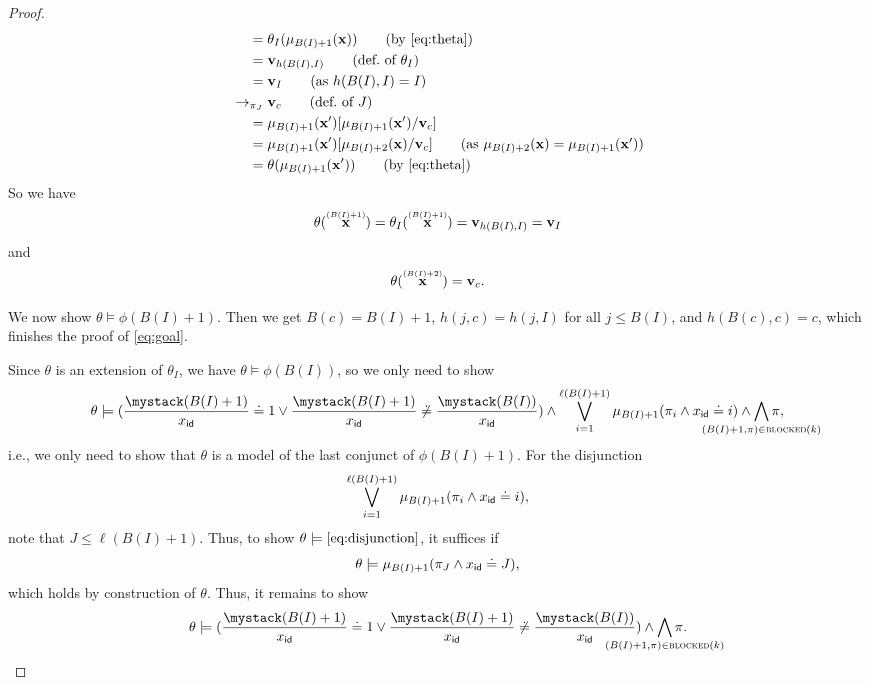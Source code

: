 {\begin{proof}
\begin{align*}
      {} = {} & \theta_I(\mu_{B(I)+1}(\vec{x})) \tag{by \eqref{eq:theta}} \\
      {} = {} & \vec{v}_{h(B(I),I)} \tag{def.\ of $\theta_I$} \\
      {} = {} & \vec{v}_I  \tag{as $h(B(I),I) = I$} \\
      {} \to_{\pi_J} {} & \vec{v}_c \tag{def.\ of $J$}\\
      {} = {} & \mu_{B(I)+1}(\vec{x}')[\mu_{B(I)+1}(\vec{x}')/\vec{v}_c] \\
      {} = {} & \mu_{B(I)+1}(\vec{x}')[\mu_{B(I)+2}(\vec{x})/\vec{v}_c] \tag{as $\mu_{B(I)+2}(\vec{x}) = \mu_{B(I)+1}(\vec{x}')$} \\
      {} = {} & \theta(\mu_{B(I)+1}(\vec{x}')) \tag{by \eqref{eq:theta}}
    \end{align*}
    So we have
    \[
      \theta(\ind{\vec{x}}{B(I)+1}) = \theta_I(\ind{\vec{x}}{B(I)+1}) = \vec{v}_{h(B(I),I)} = \vec{v}_I
    \]
    and
    \[
      \theta(\ind{\vec{x}}{B(I)+2}) = \vec{v}_c.
    \]

    We now show $\theta \models \phi(B(I)+1)$.
    Then we get $B(c) = B(I) + 1$, $h(j,c) = h(j,I)$ for all $j \leq B(I)$, and $h(B(c),c) = c$, which finishes the proof of \eqref{eq:goal}.

    Since $\theta$ is an extension of $\theta_I$, we have $\theta \models \phi(B(I))$, so we only need to show
    \[
      \theta \models (\ind[\id]{x}{B(I)+1} \doteq 1 \lor \ind[\id]{x}{B(I)+1} \not\doteq \ind[\id]{x}{B(I)}) \land \bigvee_{i=1}^{\ell(B(I)+1)}\mu_{B(I)+1}(\pi_i \land x_{\id} \doteq i) \land \bigwedge_{\mathclap{(B(I)+1,\pi) \in \blocked(k)}} \pi,
    \]
    i.e., we only need to show that $\theta$ is a model of the last conjunct of $\phi(B(I)+1)$.
    For the disjunction
    \begin{equation}
      \label{eq:disjunction}
      \bigvee_{i=1}^{\ell(B(I)+1)}\mu_{B(I)+1}(\pi_i \land x_{\mathsf{id}} \doteq i),
    \end{equation}
    note that $J \leq \ell(B(I)+1)$.
    Thus, to show $\theta \models \eqref{eq:disjunction}$, it suffices if
    \[
      \theta \models \mu_{B(I)+1}(\pi_J \land x_{\mathsf{id}} \doteq J),
    \]
    which holds by construction of $\theta$.
    Thus, it remains to show
    \[
      \theta \models (\ind[\id]{x}{B(I)+1} \doteq 1 \lor \ind[\id]{x}{B(I)+1} \not\doteq \ind[\id]{x}{B(I)}) \land \bigwedge_{\mathclap{(B(I)+1,\pi) \in \blocked(k)}} \pi.
    \]


\end{proof}}
